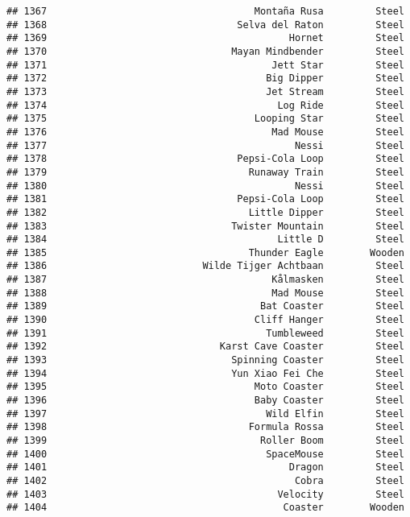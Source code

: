 \documentclass[
]{article}
\begin{document}
\begin{verbatim}
## 1367                                    Montaña Rusa         Steel
## 1368                                 Selva del Raton         Steel
## 1369                                          Hornet         Steel
## 1370                                Mayan Mindbender         Steel
## 1371                                       Jett Star         Steel
## 1372                                      Big Dipper         Steel
## 1373                                      Jet Stream         Steel
## 1374                                        Log Ride         Steel
## 1375                                    Looping Star         Steel
## 1376                                       Mad Mouse         Steel
## 1377                                           Nessi         Steel
## 1378                                 Pepsi-Cola Loop         Steel
## 1379                                   Runaway Train         Steel
## 1380                                           Nessi         Steel
## 1381                                 Pepsi-Cola Loop         Steel
## 1382                                   Little Dipper         Steel
## 1383                                Twister Mountain         Steel
## 1384                                        Little D         Steel
## 1385                                   Thunder Eagle        Wooden
## 1386                           Wilde Tijger Achtbaan         Steel
## 1387                                       Kålmasken         Steel
## 1388                                       Mad Mouse         Steel
## 1389                                     Bat Coaster         Steel
## 1390                                    Cliff Hanger         Steel
## 1391                                      Tumbleweed         Steel
## 1392                              Karst Cave Coaster         Steel
## 1393                                Spinning Coaster         Steel
## 1394                                Yun Xiao Fei Che         Steel
## 1395                                    Moto Coaster         Steel
## 1396                                    Baby Coaster         Steel
## 1397                                      Wild Elfin         Steel
## 1398                                   Formula Rossa         Steel
## 1399                                     Roller Boom         Steel
## 1400                                      SpaceMouse         Steel
## 1401                                          Dragon         Steel
## 1402                                           Cobra         Steel
## 1403                                        Velocity         Steel
## 1404                                         Coaster        Wooden

\end{verbatim}
\end{document}
